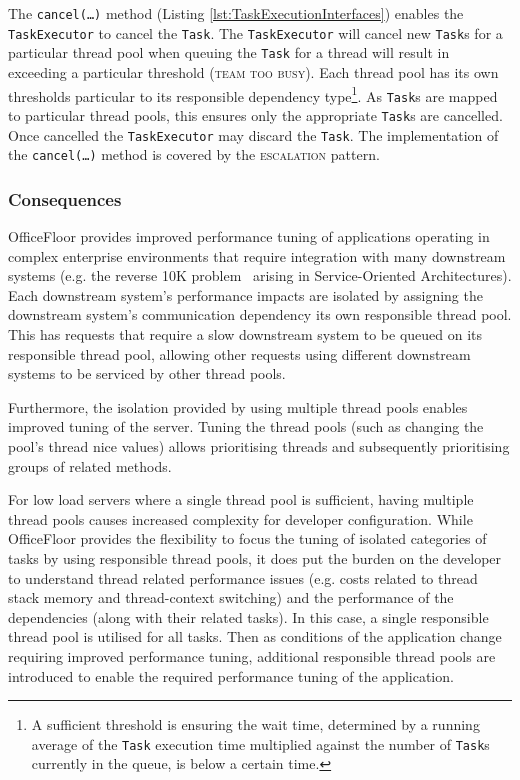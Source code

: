 \documentclass[prodmode]{style/acmlarge}
\begin{document}
The \texttt{cancel(\ldots)} method (Listing \ref{lst:TaskExecutionInterfaces})
enables the \texttt{TaskExecutor} to cancel the \texttt{Task}. The
\texttt{Task\-Executor} will cancel new \texttt{Task}s for a particular thread
pool when queuing the \texttt{Task} for a thread will result in exceeding a
particular threshold (\textsc{team too busy}).  Each thread pool has its own
thresholds particular to its responsible dependency type\footnote{A sufficient
threshold is ensuring the wait time, determined by a running average of the
\texttt{Task} execution time multiplied against the number of \texttt{Task}s
currently in the queue, is below a certain time.}.  As \texttt{Task}s are mapped
to particular thread pools, this ensures only the appropriate \texttt{Task}s are
cancelled.  Once cancelled the \texttt{TaskExecutor} may discard the
\texttt{Task}.  The implementation of the \texttt{can\-cel(\ldots)} method is
covered by the \textsc{escalation} pattern.


\subsubsection*{Consequences}

OfficeFloor provides improved performance tuning of applications operating in
complex enterprise environments that require integration with many downstream
systems (e.g. the reverse 10K problem~\cite{reverse-ten-k-problem} arising in
Service-Oriented Architectures).  Each downstream system's performance impacts
are isolated by assigning the downstream system's communication dependency its
own responsible thread pool.  This has requests that require a slow downstream
system to be queued on its responsible thread pool, allowing other requests
using different downstream systems to be serviced by other thread pools.

Furthermore, the isolation provided by using multiple thread pools enables
improved tuning of the server.  Tuning the thread pools (such as changing the
pool's thread nice values) allows prioritising threads and subsequently
prioritising groups of related methods.

For low load servers where a single thread pool is sufficient, having multiple
thread pools causes increased complexity for developer configuration.  While
OfficeFloor provides the flexibility to focus the tuning of isolated categories
of tasks by using responsible thread pools, it does put the burden on the
developer to understand thread related performance issues (e.g. costs related to
thread stack memory and thread-context switching) and the performance of the
dependencies (along with their related tasks).  In this case, a single
responsible thread pool is utilised for all tasks.  Then as conditions of the
application change requiring improved performance tuning, additional responsible
thread pools are introduced to enable the required performance tuning of the
application.
\end{document}
